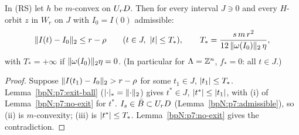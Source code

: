 \begin{lemma}\label{bpN:p7:resonant-lemma1}
In (RS) let $h$ be $m$-convex on $U_{r}D$. Then for every interval $J\ni0$ and every $H$-orbit $z$ in $W_r$ on $J$ with $I_0=I(0)$ admissible:
\[\lVert I(t)-I_0\rVert_2\le r-\rho\qquad(t\in J,\ \lvert t\rvert\le T_*),\qquad T_*=\frac{s\,m\,r^2}{12\,\lVert \omega(I_0)\rVert_2\,\eta},\]
with $T_*=+\infty$ if $\lVert \omega(I_0)\rVert_2\eta=0$. (In particular for $\Lambda=\mathbb{Z}^n$, $f_*=0$: all $t\in J$.)
\end{lemma}
\begin{proof}
\label{stepN:p7:l1-exit} Suppose $\lVert I(t_1)-I_0\rVert_2>r-\rho$ for some $t_1\in J$, $\lvert t_1\rvert\le T_*$. Lemma~\ref{bpN:p7:exit-ball} ($\lvert \cdot\rvert_*=\lVert \cdot\rVert_2$) gives $t^*\in J$, $\lvert t^*\rvert\le\lvert t_1\rvert$, with (i) of Lemma~\ref{bpN:p7:no-exit} for $t^*$.
\label{stepN:p7:l1-hyp} $I_s\in\bar B\subset U_{r}D$ (Lemma~\ref{bpN:p7:admissible}), so (ii) is $m$-convexity; (iii) is $\lvert t^*\rvert\le T_*$. Lemma~\ref{bpN:p7:no-exit} gives the contradiction.
\end{proof}

